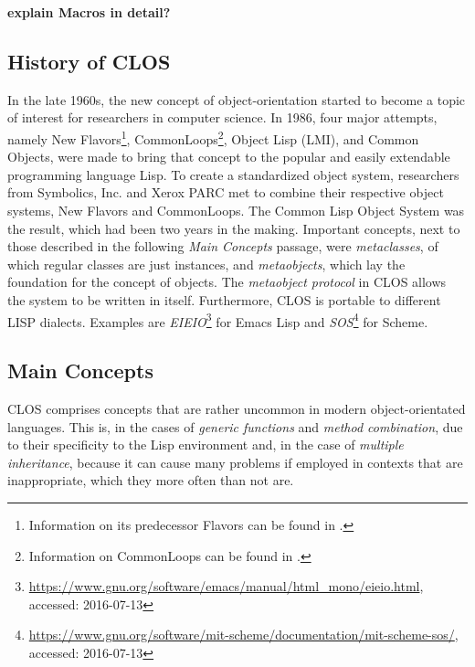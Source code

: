 \documentclass[oribibl]{llncs}
\begin{document}
\textbf{explain Macros in detail?}


\subsection{History of CLOS}
\label{sec:history}

In the late 1960s, the new concept of object-orientation started to become a topic of interest for researchers in computer science. In 1986, four major attempts, namely New Flavors\footnote{Information on its predecessor Flavors can be found in \cite{Moon:1986:OPF:28697.28698}.}, CommonLoops\footnote{Information on CommonLoops can be found in \cite{Bobrow:1986:CML:28697.28700}.}, Object Lisp (LMI), and Common Objects, were made to bring that concept to the popular and easily extendable programming language Lisp. \cite{steele1993evolution} To create a standardized object system, researchers from Symbolics, Inc. and Xerox PARC met to combine their respective object systems, New Flavors and CommonLoops. \cite{demichiel1987common} The Common Lisp Object System was the result, which had been two years in the making. \cite{steele1993evolution} Important concepts, next to those described in the following \emph{Main Concepts} passage, were \emph{metaclasses}, of which regular classes are just instances, and \emph{metaobjects}, which lay the foundation for the concept of objects. \cite{kiczales1991art} The \emph{metaobject protocol} in CLOS allows the system to be written in itself. \cite{steele1993evolution} Furthermore, CLOS is portable to different LISP dialects. Examples are \emph{EIEIO}\footnote{\url{https://www.gnu.org/software/emacs/manual/html_mono/eieio.html}, accessed: 2016-07-13} for Emacs Lisp and \emph{SOS}\footnote{\url{https://www.gnu.org/software/mit-scheme/documentation/mit-scheme-sos/}, accessed: 2016-07-13} for Scheme.



\subsection{Main Concepts}
\label{sec:concepts}

CLOS comprises concepts that are rather uncommon in modern object-orientated languages. This is, in the cases of \emph{generic functions} and \emph{method combination}, due to their specificity to the Lisp environment and, in the case of \emph{multiple inheritance}, because it can cause many problems if employed in contexts that are inappropriate, which they more often than not are. \cite{XXX} 
\end{document}
